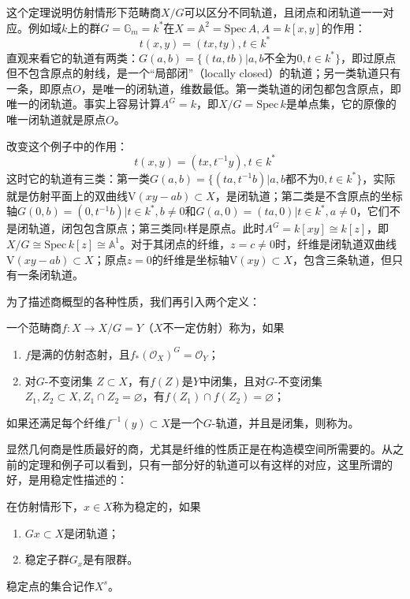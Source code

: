 这个定理说明仿射情形下范畴商$ X/G $可以区分不同轨道，且闭点和闭轨道一一对应。例如域$ k $上的群$ G=\mathbb{G}_m=k^* $在$ X=\mathbb{A}^2=\mathrm{Spec}\,A,A=k[x,y] $的作用：$$ t (x,y)=(tx,ty),t\in k^* $$
直观来看它的轨道有两类：$ G(a,b)=\{(ta,tb)|a,b \text{不全为}0,t\in k^*\} $，即过原点但不包含原点的射线，是一个“局部闭”（locally closed）的轨道；另一类轨道只有一条，即原点$ O $，是唯一的闭轨道，维数最低。第一类轨道的闭包都包含原点，即唯一的闭轨道。事实上容易计算$ A^G=k $，即$ X/G=\mathrm{Spec}\,k $是单点集，它的原像的唯一闭轨道就是原点$ O $。

改变这个例子中的作用：$$ t (x,y)=(tx,t^{-1}y),t\in k^* $$
这时它的轨道有三类：第一类$ G(a,b)=\{(ta,t^{-1}b)|a,b\text{都不为}0,t\in k^*\} $，实际就是仿射平面上的双曲线$ \mathrm{V}(xy-ab)\subset X $，是闭轨道；第二类是不含原点的坐标轴$ G(0,b)={(0,t^{-1}b)|t\in k^* },b\neq 0 $和$ G(a,0)={(ta,0)|t\in k^* },a\neq 0 $，它们不是闭轨道，闭包包含原点；第三类同t样是原点。此时$ A^G=k[xy]\cong k[z] $，即$ X/G\cong \mathrm{Spec}\,k[z]\cong \mathbb{A}^1 $。对于其闭点的纤维，$ z=c\neq 0 $时，纤维是闭轨道双曲线$ \mathrm{V}(xy-ab)\subset X $；原点$ z=0 $的纤维是坐标轴$ \mathrm{V}(xy)\subset X $，包含三条轨道，但只有一条闭轨道。

为了描述商概型的各种性质，我们再引入两个定义：
\begin{definition}
	一个范畴商$ f : X\to X/G=Y $（$ X $不一定仿射）称为，如果
	\begin{enumerate}
		\item $ f  $是满的仿射态射，且$ f_*(\mathcal{O}_X)^G=\mathcal{O}_Y $；
		\item 对$ G$-不变闭集 $ Z\subset X $，有$ f (Z) $是$ Y $中闭集，且对$ G$-不变闭集$ Z_1,Z_2\subset X,Z_1\cap Z_2=\varnothing $，有$ f(Z_1)\cap f(Z_2)=\varnothing $；
	\end{enumerate}
	如果还满足每个纤维$ f^{-1}(y)\subset X $是一个$ G$-轨道，并且是闭集，则称为。
\end{definition}

显然几何商是性质最好的商，尤其是纤维的性质正是在构造模空间所需要的。从之前的定理和例子可以看到，只有一部分好的轨道可以有这样的对应，这里所谓的好，是用稳定性描述的：
\begin{definition}
	在仿射情形下，$ x\in X $称为稳定的，如果
	\begin{enumerate}
		\item $ Gx\subset X $是闭轨道；
		\item 稳定子群$ G_x $是有限群。
	\end{enumerate}
	稳定点的集合记作$ X^s $。
\end{definition}


